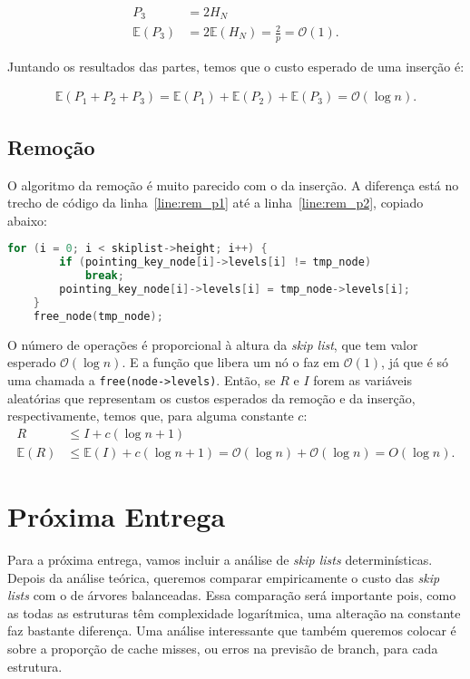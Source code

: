\documentclass[paper=a4, fontsize=11pt]{scrartcl} %
\numberwithin{equation}{section}
\numberwithin{figure}{section}
\numberwithin{table}{section}
\numberwithin{definition}{section}
\numberwithin{theorem}{section}
\numberwithin{property}{section}
\numberwithin{proposition}{section}
\newcommand{\cO}{\ensuremath{\mathcal{O}}}
\newcommand{\sls}{\textit{skip lists}\xspace}
\renewcommand{\sl}{\textit{skip list}\xspace}
\newcommand{\Exp}{\ensuremath{{\mathbb{E}}}\xspace}
\begin{document}
\begin{align*}
P_3 &= 2 H_N \\
\Exp(P_3) &= 2 \Exp(H_N) = \frac{2}{p} = \cO(1).
\end{align*}


Juntando os resultados das partes, temos que o custo esperado de uma inserção é:

\begin{align*}
\Exp(P_1 + P_2 + P_3) = \Exp(P_1) + \Exp(P_2) + \Exp(P_3) = \cO(\log n).
\end{align*}


\subsection{Remoção}

O algoritmo da remoção é muito parecido com o da inserção. A diferença está no trecho de código da linha~\ref{line:rem_p1}
até a linha~\ref{line:rem_p2}, copiado abaixo:
\begin{lstlisting}[caption=Parte exclusiva da Remoção, language=C]
    for (i = 0; i < skiplist->height; i++) {
        if (pointing_key_node[i]->levels[i] != tmp_node)
            break;
        pointing_key_node[i]->levels[i] = tmp_node->levels[i];
    }
    free_node(tmp_node);
\end{lstlisting}

O número de operações é proporcional à altura da \sl, que tem valor esperado $\cO(\log n)$. E a função 
que libera um nó o faz em $\cO(1)$, já que é só uma chamada a \verb|free(node->levels)|. Então, se $R$ e $I$ forem
as variáveis aleatórias que representam os custos esperados da remoção e da inserção, respectivamente, temos que,
para alguma constante $c$:
\begin{align*}
R &\leq I + c( \log n + 1) \\
\Exp(R) &\leq \Exp(I) + c( \log n + 1) = \cO(\log n) + \cO(\log n) = O(\log n).
\end{align*}

\section{Próxima Entrega}

Para a próxima entrega, vamos incluir a análise de \sls determinísticas. Depois da análise teórica, queremos
comparar empiricamente o custo das \sls com o de árvores balanceadas. Essa comparação será importante pois, como
as todas as estruturas têm complexidade logarítmica, uma alteração na constante faz bastante diferença. Uma
análise interessante que também queremos colocar é sobre a proporção de cache misses, 
ou erros na previsão de branch, para cada estrutura. 


{}
\end{document}
